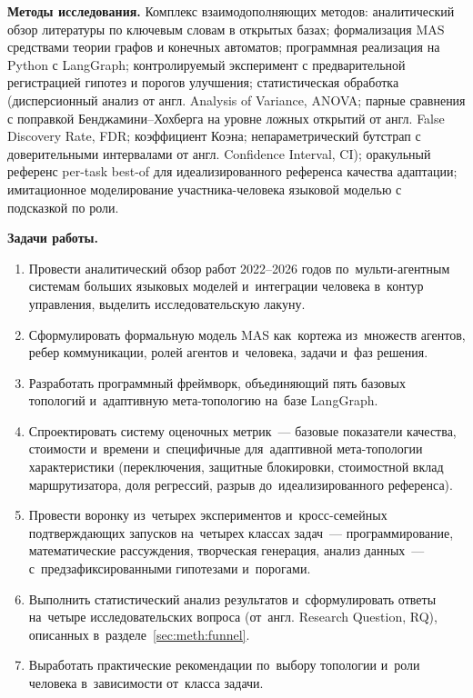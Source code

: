 \textbf{Методы исследования.} Комплекс взаимодополняющих методов:
аналитический обзор литературы по ключевым словам в открытых базах;
формализация MAS средствами теории графов и конечных автоматов;
программная реализация на Python с LangGraph; контролируемый
эксперимент с предварительной регистрацией гипотез и порогов
улучшения; статистическая обработка (дисперсионный анализ от англ.
Analysis of Variance, ANOVA; парные сравнения с поправкой
Бенджамини--Хохберга на уровне ложных открытий от англ. False
Discovery Rate, FDR; коэффициент Коэна; непараметрический
бутстрап с доверительными интервалами от англ. Confidence
Interval, CI); оракульный референс per-task best-of
для идеализированного референса качества адаптации; имитационное моделирование
участника-человека языковой моделью с подсказкой по роли.

\textbf{Задачи работы.}
\begin{enumerate}
  \item Провести аналитический обзор работ 2022--2026 годов
        по~мульти-агентным системам больших языковых моделей и~интеграции
        человека в~контур управления, выделить исследовательскую лакуну.
  \item Сформулировать формальную модель MAS как~кортежа из~множеств
        агентов, ребер коммуникации, ролей агентов и~человека, задачи
        и~фаз решения.
  \item Разработать программный фреймворк, объединяющий пять базовых
        топологий и~адаптивную мета-топологию на~базе LangGraph.
  \item Спроектировать систему оценочных метрик~--- базовые показатели
        качества, стоимости и~времени и~специфичные для~адаптивной
        мета-топологии характеристики (переключения, защитные блокировки,
        стоимостной вклад маршрутизатора, доля регрессий, разрыв
        до~идеализированного референса).
  \item Провести воронку из~четырех экспериментов и~кросс-семейных
        подтверждающих запусков на~четырех классах задач~--- программирование,
        математические рассуждения, творческая генерация, анализ
        данных~--- с~предзафиксированными гипотезами и~порогами.
  \item Выполнить статистический анализ результатов и~сформулировать
        ответы на~четыре исследовательских вопроса (от~англ. Research
        Question, RQ), описанных в~разделе~\ref{sec:meth:funnel}.
  \item Выработать практические рекомендации по~выбору топологии
        и~роли человека в~зависимости от~класса задачи.
\end{enumerate}

